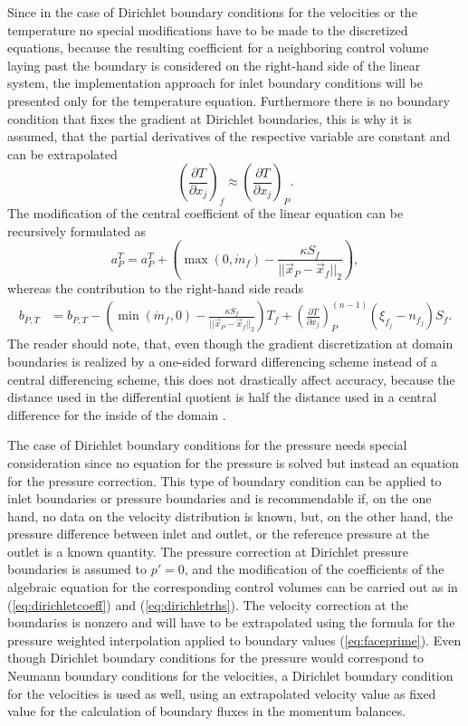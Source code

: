 Since in the case of Dirichlet boundary conditions for the velocities or the temperature no special modifications have to be made to the discretized equations, because the resulting coefficient for a neighboring control volume laying past the boundary is considered on the right-hand side of the linear system, the implementation approach for inlet boundary conditions will be presented only for the temperature equation. Furthermore there is no boundary condition that fixes the gradient at Dirichlet boundaries, this is why it is assumed, that the partial derivatives of the respective variable are constant and can be extrapolated
\begin{displaymath}
  \left( \frac{\partial T}{\partial x_j} \right)_f \approx \left( \frac{\partial T}{\partial x_j} \right)_P.
\end{displaymath}
The modification of the central coefficient of the linear equation can be recursively formulated as
\begin{equation}
  \label{eq:dirichletcoeff}
  a_P^{T} = a_P^{T} + \left( \max(0,\dot{m}_f )  - \frac{\kappa S_f}{|| \vec{x}_P - \vec{x}_f ||_2} \right),
\end{equation}
whereas the contribution to the right-hand side reads
\begin{align}
  \label{eq:dirichletrhs}
  b_{P,T} &= b_{P,T} - \left( \min(\dot{m}_f,0) - \frac{\kappa S_f}{||\vec{x}_P - \vec{x}_f||_2}\right) T_f +
  \left( \frac{\partial T}{\partial x_j}\right)_P^{(n-1)} \left(\xi_{f_j} - n_{f_j}\right)S_f.
\end{align}
The reader should note, that, even though the gradient discretization at domain boundaries is realized by a one-sided forward differencing scheme instead of a central differencing scheme, this does not drastically affect accuracy, because the distance used in the differential quotient is half the distance used in a central difference for the inside of the domain \cite{schaefer99}.

The case of Dirichlet boundary conditions for the pressure needs special consideration since no equation for the pressure is solved but instead an equation for the pressure correction. This type of boundary condition can be applied to inlet boundaries or pressure boundaries and is recommendable if, on the one hand, no data on the velocity distribution is known, but, on the other hand, the pressure difference between inlet and outlet, or the reference pressure at the outlet is a known quantity. The pressure correction at Dirichlet pressure boundaries is assumed to \(p' = 0\), and the modification of the coefficients of the algebraic equation for the corresponding control volumes can be carried out as in (\ref{eq:dirichletcoeff}) and (\ref{eq:dirichletrhs}). The velocity correction at the boundaries is nonzero and will have to be extrapolated using the formula for the pressure weighted interpolation applied to boundary values (\ref{eq:faceprime}). Even though Dirichlet boundary conditions for the pressure would correspond to Neumann boundary conditions for the velocities, a Dirichlet boundary condition for the velocities is used as well, using an extrapolated velocity value as fixed value for the calculation of boundary fluxes in the momentum balances. 

